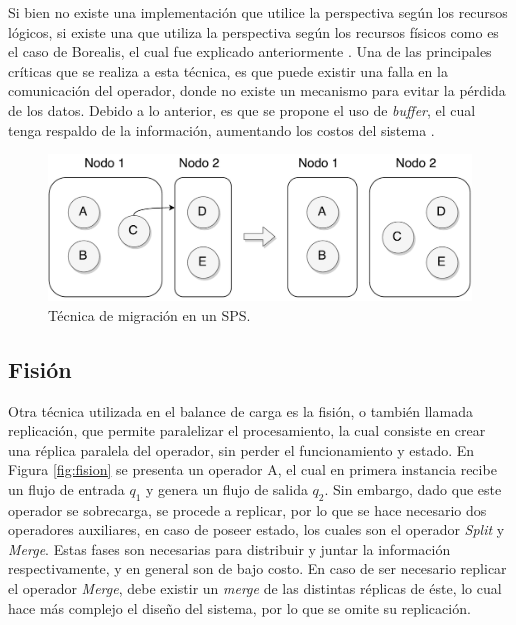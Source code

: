 Si bien no existe una implementación que utilice la perspectiva según los recursos lógicos, si existe una que utiliza la perspectiva según los recursos físicos como es el caso de Borealis, el cual fue explicado anteriormente \citep{XingZH05}. Una de las principales críticas que se realiza a esta técnica, es que puede existir una falla en la comunicación del operador, donde no existe un mecanismo para evitar la pérdida de los datos. Debido a lo anterior, es que se propone el uso de \textit{buffer}, el cual tenga respaldo de la información, aumentando los costos del sistema \citep{PittauACA07}.

\begin{figure}[!ht]
	\centering
	\includegraphics[scale=0.45]{images/Migracion.pdf}
	\caption{Técnica de migración en un SPS.}
	\label{fig:migracion}
\end{figure}

\subsection{Fisión}
\label{sec:fisionBC}


Otra técnica utilizada en el balance de carga es la fisión, o también llamada replicación, que permite paralelizar el procesamiento, la cual consiste en crear una réplica paralela del operador, sin perder el funcionamiento y estado. En Figura \ref{fig:fision} se presenta un operador A, el cual en primera instancia recibe un flujo de entrada $q_1$ y genera un flujo de salida $q_2$. Sin embargo, dado que este operador se sobrecarga, se procede a replicar, por lo que se hace necesario dos operadores auxiliares, en caso de poseer estado, los cuales son el operador \textit{Split} y \textit{Merge}. Estas fases son necesarias para distribuir y juntar la información respectivamente, y en general son de bajo costo. En caso de ser necesario replicar el operador \textit{Merge}, debe existir un \textit{merge} de las distintas réplicas de éste, lo cual hace más complejo el diseño del sistema, por lo que se omite su replicación.

